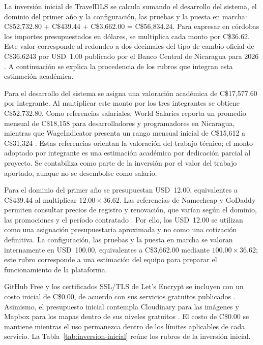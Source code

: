 La inversión inicial de TravelDLS se calcula sumando el desarrollo del sistema, el dominio del primer año y la configuración, las pruebas y la puesta en marcha: C\$52,732.80 + C\$439.44 + C\$3,662.00 = C\$56,834.24. Para expresar en córdobas los importes presupuestados en dólares, se multiplica cada monto por C\$36.62. Este valor corresponde al redondeo a dos decimales del tipo de cambio oficial de C\$36.6243 por USD~1.00 publicado por el Banco Central de Nicaragua para 2026 \parencite{bcn2026tipocambio}. A continuación se explica la procedencia de los rubros que integran esta estimación académica.

Para el desarrollo del sistema se asigna una valoración académica de C\$17,577.60 por integrante. Al multiplicar este monto por los tres integrantes se obtiene C\$52,732.80. Como referencias salariales, World Salaries reporta un promedio mensual de C\$18,158 para desarrolladores y programadores en Nicaragua, mientras que WageIndicator presenta un rango mensual inicial de C\$15,612 a C\$31,324 \parencite{worldsalaries2026developer,wageindicator2026desarrolladores}. Estas referencias orientan la valoración del trabajo técnico; el monto adoptado por integrante es una estimación académica por dedicación parcial al proyecto. Se contabiliza como parte de la inversión por el valor del trabajo aportado, aunque no se desembolse como salario.

Para el dominio del primer año se presupuestan USD~12.00, equivalentes a C\$439.44 al multiplicar $12.00 \times 36.62$. Las referencias de Namecheap y GoDaddy permiten consultar precios de registro y renovación, que varían según el dominio, las promociones y el período contratado \parencite{namecheapdomain,godaddy2026domain}. Por ello, los USD~12.00 se utilizan como una asignación presupuestaria aproximada y no como una cotización definitiva. La configuración, las pruebas y la puesta en marcha se valoran internamente en USD~100.00, equivalentes a C\$3,662.00 mediante $100.00 \times 36.62$; este rubro corresponde a una estimación del equipo para preparar el funcionamiento de la plataforma.

GitHub Free y los certificados SSL/TLS de Let's Encrypt se incluyen con un costo inicial de C\$0.00, de acuerdo con sus servicios gratuitos publicados \parencite{githubpricing,letsencrypt2021about}. Asimismo, el presupuesto inicial contempla Cloudinary para las imágenes y Mapbox para los mapas dentro de sus niveles gratuitos \parencite{cloudinarypricing,mapboxpricing}. El costo de C\$0.00 se mantiene mientras el uso permanezca dentro de los límites aplicables de cada servicio. La Tabla~\ref{tab:inversion-inicial} reúne los rubros de la inversión inicial.

